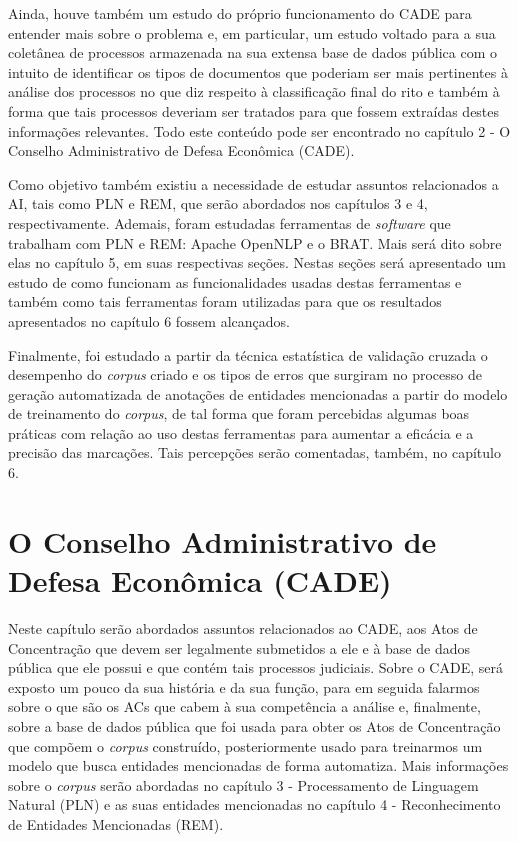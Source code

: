 \documentclass[11pt]{report}
\begin{document}
Ainda, houve também um estudo do próprio funcionamento do CADE para entender mais sobre o problema e, em particular, um estudo voltado para a sua coletânea de processos
armazenada na sua extensa base de dados pública com o intuito de identificar os tipos de documentos que poderiam ser mais pertinentes à análise dos processos no que diz respeito
à classificação final do rito e também à forma que tais processos deveriam ser tratados para que fossem extraídas destes informações relevantes. Todo este conteúdo pode ser encontrado no
capítulo 2 - O Conselho Administrativo de Defesa Econômica (CADE).

Como objetivo também existiu a necessidade de estudar assuntos relacionados a AI, tais como PLN e REM, que serão abordados nos capítulos 3 e 4, respectivamente.
Ademais, foram estudadas ferramentas de \textit{software} que trabalham com PLN e REM: Apache OpenNLP e o BRAT. Mais será dito sobre elas no capítulo 5, em suas
respectivas seções. Nestas seções será apresentado um estudo de como funcionam as funcionalidades usadas destas ferramentas e também como tais ferramentas foram
utilizadas para que os resultados apresentados no capítulo 6 fossem alcançados.

Finalmente, foi estudado a partir da técnica estatística de validação cruzada o desempenho do \textit{corpus} criado e os tipos de erros que surgiram no processo de geração automatizada
de anotações de entidades mencionadas a partir do modelo de treinamento do \textit{corpus}, de tal forma que foram percebidas algumas boas práticas com relação ao uso destas ferramentas
para aumentar a eficácia e a precisão das marcações. Tais percepções serão comentadas, também, no capítulo 6.

\pagebreak
\chapter{O Conselho Administrativo de Defesa Econômica (CADE)}

\indent\indent Neste capítulo serão abordados assuntos relacionados ao CADE, aos Atos de Concentração que devem ser legalmente submetidos a ele e à base de dados pública que ele possui e
que contém tais processos judiciais. Sobre o CADE, será exposto um pouco da sua história e da sua função, para em seguida falarmos sobre o que são os ACs que cabem à sua competência
a análise e, finalmente, sobre a base de dados pública que foi usada para obter os Atos de Concentração que compõem o \textit{corpus} construído, posteriormente usado para treinarmos um modelo
que busca entidades mencionadas de forma automatiza. Mais informações sobre o \textit{corpus} serão abordadas no capítulo 3 - Processamento de Linguagem Natural (PLN) e as suas entidades mencionadas no capítulo 4 - Reconhecimento de Entidades Mencionadas (REM).
\end{document}
